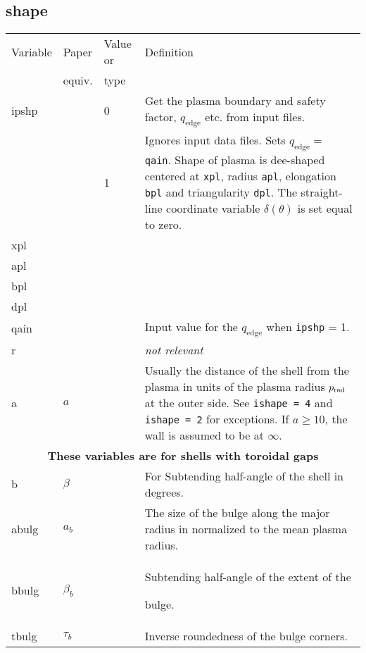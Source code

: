 \documentclass[10pt]{article}
\newcommand{\style}[1]{\texttt{#1}}
\newcommand{\notr}{\textsl{not relevant}}
\renewcommand{\qedge}{q_\mathrm{edge}}
\begin{document}
\subsection{shape}

\begin{center}
\begin{tabular}{|l|l|p{1.0in}|p{3.8in}|}
\hline

Variable & Paper  & Value or &  Definition \\ 
         & equiv. &  type  & \\ \hline

ipshp    &  & 0 & Get the plasma boundary and safety factor,
                 $\qedge$ etc. from input files.\\

         & & 1 & Ignores input data files. Sets $\qedge = $
         \style{qain}. Shape of plasma is dee-shaped centered at
         \style{xpl}, radius \style{apl}, elongation \style{bpl} and
         triangularity \style{dpl}. The straight-line coordinate
         variable $\delta(\theta)$ is set equal to  zero. \\

xpl    & & & \\
apl    &&&   \\
bpl    &&&   \\
dpl    &&&   \\

qain  & & & Input value for the $\qedge$ when \style{ipshp} = 1. \\ 

r    &&& \notr \\

a & $a$ & &Usually the distance of the shell from the plasma in units
of the plasma radius $p_{\rm rad}$ at the outer side. See
\style{ishape = 4} and \style{ishape = 2} for exceptions. If $a \ge
10$, the wall is assumed to be at $\infty$.\\ \hline

\multicolumn{4}{|c|}{\textbf{These variables are for shells with toroidal gaps}}\\

b         & $\beta$   && For  Subtending half-angle of the shell in degrees.\\

abulg     & $a_b$    & & The size of the bulge along the major radius
in normalized to the mean plasma radius. \\

bbulg     & $\beta_b$ & & Subtending half-angle of the extent of the

bulge. \\

tbulg     & $\tau_b$ & & Inverse roundedness of the bulge corners.  \\ \hline
\end{tabular} \vspace{.3in}
\end{center}
\end{document}
